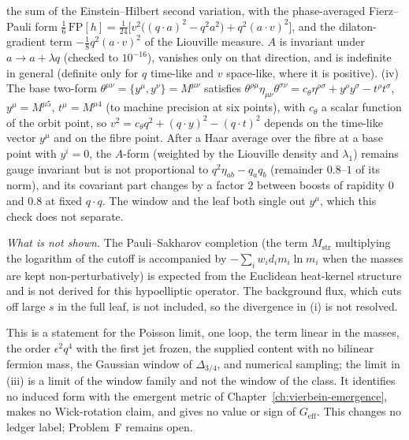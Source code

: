 the sum of the Einstein--Hilbert second variation, with the phase-averaged Fierz--Pauli form \(\tfrac16\,\mathrm{FP}[h]=\tfrac1{24}\bigl[v^2\bigl((q\cdot a)^2-q^2a^2\bigr)+q^2(a\cdot v)^2\bigr]\), and the dilaton-gradient term \(-\tfrac18q^2(a\cdot v)^2\) of the Liouville measure. \(A\) is invariant under \(a\to a+\lambda q\) (checked to \(10^{-16}\)), vanishes only on that direction, and is indefinite in general (definite only for \(q\) time-like and \(v\) space-like, where it is positive). (iv) The base two-form \(\theta^{\mu\nu}=\{y^\mu,y^\nu\}=M^{\mu\nu}\) satisfies \(\theta^{\rho\mu}\eta_{\mu\nu}\theta^{\sigma\nu}=c_\theta\eta^{\rho\sigma}+y^\rho y^\sigma-t^\rho t^\sigma\), \(y^\mu=M^{\mu5}\), \(t^\mu=M^{\mu4}\) (to machine precision at six points), with \(c_\theta\) a scalar function of the orbit point, so \(v^2=c_\theta q^2+(q\cdot y)^2-(q\cdot t)^2\) depends on the time-like vector \(y^\mu\) and on the fibre point. After a Haar average over the fibre at a base point with \(y^i=0\), the \(A\)-form (weighted by the Liouville density and \(\lambda_1\)) remains gauge invariant but is not proportional to \(q^2\eta_{ab}-q_aq_b\) (remainder \(0.8\)--\(1\) of its norm), and its covariant part changes by a factor \(2\) between boosts of rapidity \(0\) and \(0.8\) at fixed \(q\cdot q\). The window and the leaf both single out \(y^\mu\), which this check does not separate.

\emph{What is not shown.} The Pauli--Sakharov completion (the term \(M_{\mathrm{str}}\) multiplying the logarithm of the cutoff is accompanied by \(-\sum_iw_id_im_i\ln m_i\) when the masses are kept non-perturbatively) is expected from the Euclidean heat-kernel structure and is not derived for this hypoelliptic operator. The background flux, which cuts off large \(s\) in the full leaf, is not included, so the divergence in (i) is not resolved.

This is a statement for the Poisson limit, one loop, the term linear in the masses, the order \(\epsilon^2q^4\) with the first jet frozen, the supplied content with no bilinear fermion mass, the Gaussian window of \(\Delta_{3/4}\), and numerical sampling; the limit in (iii) is a limit of the window family and not the window of the class. It identifies no induced form with the emergent metric of Chapter~\ref{ch:vierbein-emergence}, makes no Wick-rotation claim, and gives no value or sign of \(G_{\mathrm{eff}}\). This changes no ledger label; Problem~F remains open.
